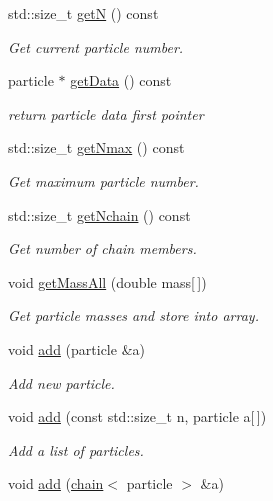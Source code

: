 \begin{DoxyCompactItemize}
std\+::size\+\_\+t \hyperlink{classARC_1_1chainlist_a9b45780f42626b14e3a2fd7b5de4bf32}{getN} () const
\begin{DoxyCompactList}\small\item\em Get current particle number. \end{DoxyCompactList}\item 
particle $\ast$ \hyperlink{classARC_1_1chainlist_a04c91168be9a14ed7b9bd958d6b1f369}{get\+Data} () const
\begin{DoxyCompactList}\small\item\em return particle data first pointer \end{DoxyCompactList}\item 
std\+::size\+\_\+t \hyperlink{classARC_1_1chainlist_a2ba52f639df8bbd830b669c78c954131}{get\+Nmax} () const
\begin{DoxyCompactList}\small\item\em Get maximum particle number. \end{DoxyCompactList}\item 
std\+::size\+\_\+t \hyperlink{classARC_1_1chainlist_aa1bd568975acc3bab3410e4fc9cb4d94}{get\+Nchain} () const
\begin{DoxyCompactList}\small\item\em Get number of chain members. \end{DoxyCompactList}\item 
void \hyperlink{classARC_1_1chainlist_a5cf42b57b7088cf7418ae3d9f1b610fa}{get\+Mass\+All} (double mass\mbox{[}$\,$\mbox{]})
\begin{DoxyCompactList}\small\item\em Get particle masses and store into array. \end{DoxyCompactList}\item 
void \hyperlink{classARC_1_1chainlist_afa780edfa301cc22cf189e63d7a59c2c}{add} (particle \&a)
\begin{DoxyCompactList}\small\item\em Add new particle. \end{DoxyCompactList}\item 
void \hyperlink{classARC_1_1chainlist_a2dba82eb1c3caa32fc76b619c5379da5}{add} (const std\+::size\+\_\+t n, particle a\mbox{[}$\,$\mbox{]})
\begin{DoxyCompactList}\small\item\em Add a list of particles. \end{DoxyCompactList}\item 
void \hyperlink{classARC_1_1chainlist_a28fd6f0d4ba0ec36601dc92d340b2d2b}{add} (\hyperlink{classARC_1_1chain}{chain}$<$ particle $>$ \&a)

\end{DoxyCompactItemize}
